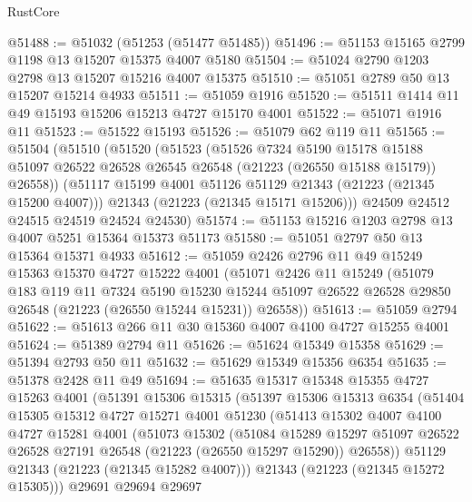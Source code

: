 \begin{lexlean}{RustCore}
\begin{coremodule}
@51488 := @51032 (@51253 (@51477 @51485))
@51496 := @51153 @15165 @2799 @1198 @13 @15207 @15375 @4007 @5180
@51504 := @51024 @2790 @1203 @2798 @13 @15207 @15216 @4007 @15375
@51510 := @51051 @2789 @50 @13 @15207 @15214 @4933
@51511 := @51059 @1916
@51520 := @51511 @1414 @11 @49 @15193 @15206 @15213 @4727 @15170 @4001
@51522 := @51071 @1916 @11
@51523 := @51522 @15193
@51526 := @51079 @62 @119 @11
@51565 := @51504
    (@51510
      (@51520
        (@51523
          (@51526
            @7324
            @5190
            @15178
            @15188
            @51097
            @26522
            @26528
            @26545
            @26548
            (@21223 (@26550 @15188 @15179))
            @26558))
        (@51117 @15199 @4001 @51126 @51129 @21343 (@21223 (@21345 @15200 @4007)))
        @21343
        (@21223 (@21345 @15171 @15206)))
      @24509
      @24512
      @24515
      @24519
      @24524
      @24530)
@51574 := @51153 @15216 @1203 @2798 @13 @4007 @5251 @15364 @15373 @51173
@51580 := @51051 @2797 @50 @13 @15364 @15371 @4933
@51612 := @51059
    @2426
    @2796
    @11
    @49
    @15249
    @15363
    @15370
    @4727
    @15222
    @4001
    (@51071
      @2426
      @11
      @15249
      (@51079
        @183
        @119
        @11
        @7324
        @5190
        @15230
        @15244
        @51097
        @26522
        @26528
        @29850
        @26548
        (@21223 (@26550 @15244 @15231))
        @26558))
@51613 := @51059 @2794
@51622 := @51613 @266 @11 @30 @15360 @4007 @4100 @4727 @15255 @4001
@51624 := @51389 @2794 @11
@51626 := @51624 @15349 @15358
@51629 := @51394 @2793 @50 @11
@51632 := @51629 @15349 @15356 @6354
@51635 := @51378 @2428 @11 @49
@51694 := @51635
    @15317
    @15348
    @15355
    @4727
    @15263
    @4001
    (@51391
      @15306
      @15315
      (@51397
        @15306
        @15313
        @6354
        (@51404
          @15305
          @15312
          @4727
          @15271
          @4001
          @51230
          (@51413
            @15302
            @4007
            @4100
            @4727
            @15281
            @4001
            (@51073
              @15302
              (@51084
                @15289
                @15297
                @51097
                @26522
                @26528
                @27191
                @26548
                (@21223 (@26550 @15297 @15290))
                @26558))
            @51129
            @21343
            (@21223 (@21345 @15282 @4007)))
          @21343
          (@21223 (@21345 @15272 @15305)))
        @29691
        @29694
        @29697

\end{coremodule}
\end{lexlean}
